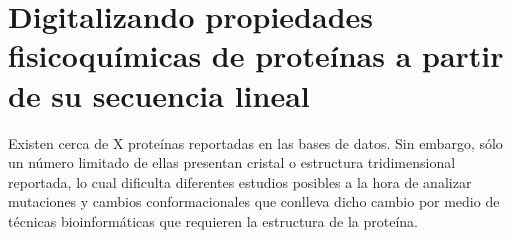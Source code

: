 \chapter{Digitalizando propiedades fisicoquímicas de proteínas a partir de su secuencia lineal}

\ifpdf
    \graphicspath{{Chapter3/Figs/Raster/}{Chapter3/Figs/PDF/}{Chapter3/Figs/}}
\else
    \graphicspath{{Chapter3/Figs/Vector/}{Chapter3/Figs/}}
\fi

Existen cerca de X proteínas reportadas en las bases de datos. Sin embargo, sólo un número limitado de ellas presentan cristal o estructura tridimensional reportada, lo cual dificulta diferentes estudios posibles a la hora de analizar mutaciones y cambios conformacionales que conlleva dicho cambio por medio de técnicas bioinformáticas que requieren la estructura de la proteína.
 